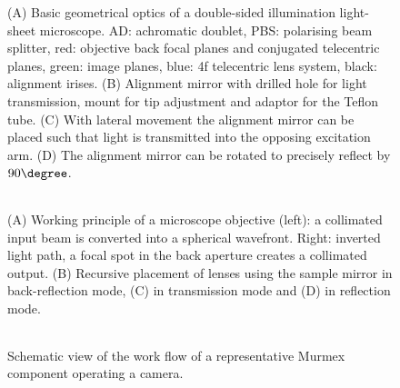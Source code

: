 \documentclass[12pt]{spieman}  %
\begin{document}
\begin{spacing}{2}
\begin{figure}
   \begin{center}
   \begin{tabular}{c}
   \end{tabular}
   \end{center}
   \caption{\label{fig:alignment} (A) Basic geometrical optics of a double-sided illumination light-sheet microscope. AD: achromatic doublet, PBS: polarising beam splitter, red: objective back focal planes and conjugated telecentric planes, green: image planes, blue: 4f telecentric lens system, black: alignment irises. (B) Alignment mirror with drilled hole for light transmission, mount for tip adjustment and adaptor for the Teflon tube. (C) With lateral movement the alignment mirror can be placed such that light is transmitted into the opposing excitation arm. (D) The alignment mirror can be rotated to precisely reflect by $90\degree$.} 
   \end{figure}	

\begin{figure}
   \begin{center}
   \begin{tabular}{c}
   \end{tabular}
   \end{center}
   \caption{\label{fig:alignment2} (A) Working principle of a microscope objective (left): a collimated input beam is converted into a spherical wavefront. Right: inverted light path, a focal spot in the back aperture creates a collimated output. (B) Recursive placement of lenses using the sample mirror in back-reflection mode, (C) in transmission mode and (D) in reflection mode.} 
   \end{figure}	
	
\begin{figure}
   \begin{center}
   \begin{tabular}{c}
   \end{tabular}
   \end{center}
   \caption{\label{fig:murmex} Schematic view of the work flow of a representative Murmex component operating a camera.} 
   \end{figure}
	
\end{spacing}
\end{document}
